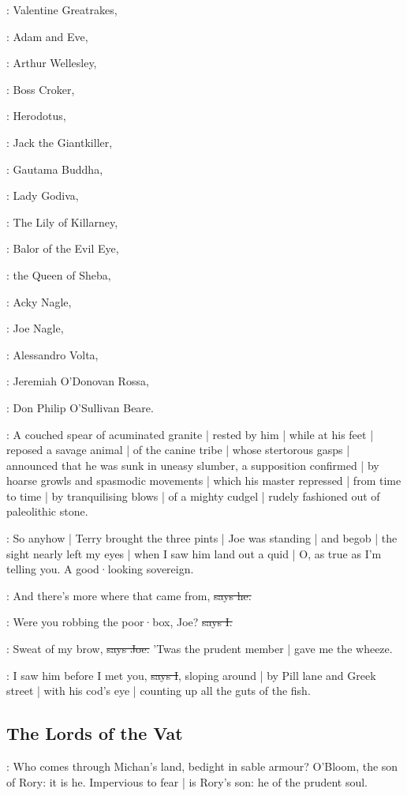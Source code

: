 :
Valentine Greatrakes,

:
Adam and Eve,

:
Arthur Wellesley,

:
Boss Croker,

:
Herodotus,

:
Jack the Giantkiller,

:
Gautama Buddha,

:
Lady Godiva,

:
The Lily of Killarney,

:
Balor of the Evil Eye,

:
the Queen of Sheba,

:
Acky Nagle,

:
Joe Nagle,

:
Alessandro Volta,

:
Jeremiah O'Donovan Rossa,

:
Don Philip O'Sullivan Beare.

:
A couched spear of acuminated granite |
rested by him
 |
while at his feet |
reposed a savage animal |
of the canine tribe |
whose stertorous gasps |
announced that he was sunk in uneasy slumber,
a supposition confirmed |
by hoarse growls and spasmodic movements |
which his master repressed |
from time to time |
by tranquilising blows |
of a mighty cudgel |
rudely fashioned out of paleolithic stone.

\Nq:
So anyhow |
Terry brought the three pints |
Joe was standing |
and begob |
the sight nearly left my eyes |
when I saw him land out a quid |
O,
as true as I'm telling you.
A good·looking sovereign.

\joe:
And there's more where that came from,
\sout{says he.}

:
Were you robbing the poor·box,
Joe?
\sout{says I.}

\joe:
Sweat of my brow,
\sout{says Joe.}
'Twas the prudent member |
gave me the wheeze.

:
I saw him before I met you,
\sout{says I},
sloping around |
by Pill lane and Greek street |
with his cod's eye |
counting up all the guts of the fish.


\subsection*{The Lords of the Vat}

:
Who comes through Michan's land,
bedight in sable armour?
O'Bloom,
the son of Rory:
it is he.
Impervious to fear |
is Rory's son:
he of the prudent soul.

